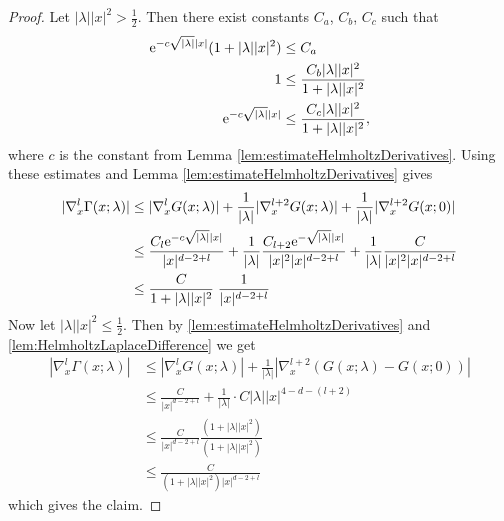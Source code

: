   \begin{proof}
    Let $|\lambda| |x|^2 > \frac{1}{2}$. 
    Then there exist constants $C_a$, $C_b$, $C_c$ such that
    \begin{align*}
      \mathrm{e}^{-c \sqrt{|\lambda|} |x|} ( 1 + |\lambda| |x|^2) &\leq C_a \\
      1 &\leq \frac{C_b |\lambda| |x|^2}{1 + |\lambda| |x|^2} \\
      \mathrm{e}^{-c \sqrt{|\lambda|} |x|} &\leq \frac{ C_c |\lambda| |x|^2}{1 + |\lambda| |x|^2},
    \end{align*}
    where $c$ is the constant from Lemma \ref{lem:estimateHelmholtzDerivatives}.
    Using these estimates and Lemma \ref{lem:estimateHelmholtzDerivatives} gives
    \begin{align*}
      |\nabla_x^l \Gamma(x; \lambda) |
      &\leq |\nabla_x^l G(x; \lambda)| + \frac{1}{|\lambda|} |\nabla_x^{l + 2} G(x; \lambda) | + \frac{1}{|\lambda|} |\nabla_x^{l + 2} G(x; 0)| \\
    &\leq\frac{C_l \mathrm{e}^{-c \sqrt{|\lambda|} |x|}}{|x|^{d - 2 + l}} + \frac{1}{|\lambda|} \frac{C_{l + 2} \mathrm{e}^{-\sqrt{|\lambda|} |x|}}{|x|^2 |x|^{d - 2 + l}} + \frac{1}{|\lambda|} \frac{C}{|x|^2 |x|^{d - 2 + l}} \\
    &\leq \frac{C}{1 + |\lambda| |x|^2}\; \frac{1}{|x|^{d - 2 + l}}
    \end{align*}
    Now let $|\lambda| |x|^2 \leq \frac{1}{2}$.
    Then by \ref{lem:estimateHelmholtzDerivatives} and \ref{lem:HelmholtzLaplaceDifference} we get
    \begin{align*}
      |\nabla_x^l \Gamma(x; \lambda) |
      &\leq |\nabla_x^l G(x; \lambda) | + \frac{1}{|\lambda|} |\nabla_x^{l + 2} ( G(x; \lambda) - G(x; 0))| \\
      &\leq \frac{C}{|x|^{d - 2 + l}} + \frac{1}{|\lambda|} \cdot C |\lambda| |x|^{4 - d - (l + 2)} \\
      &\leq \frac{C}{|x|^{d - 2 + l}} \frac{(1 + |\lambda| |x|^2)}{(1 + |\lambda| |x|^2)} \\
      &\leq \frac{C}{(1 + |\lambda| |x|^2) |x|^{d - 2 + l}}
    \end{align*}
    which gives the claim.
  \end{proof}

